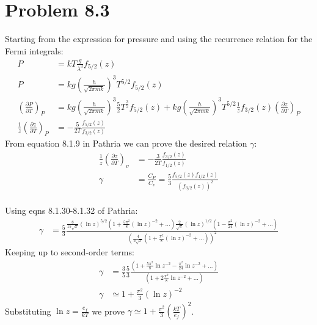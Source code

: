 \documentclass[a4paper,11pt]{article}
\numberwithin{equation}{section}
\begin{document}
\section{Problem 8.3}
Starting from the expression for pressure and using the recurrence relation for the Fermi integrals:
\begin{align}
 P &= kT\frac{g}{\lambda^3}f_{5/2}(z)\\
 P &= kg\left(\frac{h}{\sqrt{2\pi mk}}\right)^3T^{5/2}f_{5/2}(z)\\
 \left(\frac{\partial P}{\partial T}\right)_P &= kg\left(\frac{h}{\sqrt{2\pi mk}}\right)^3\frac{5}{2}T^{\frac{3}{2}}f_{5/2}(z)+
						kg\left(\frac{h}{\sqrt{2\pi mk}}\right)^3T^{5/2}\frac{1}{z}f_{3/2}(z)\left(\frac{\partial z}{\partial T} \right)_P\\
 \frac{1}{z}\left(\frac{\partial z}{\partial T} \right)_P &= -\frac{5}{2T}\frac{f_{5/2}(z)}{f_{3/2}(z)}
\end{align}
From equation 8.1.9 in Pathria we can prove the desired relation $\gamma$:
\begin{align}
  \frac{1}{z}\left(\frac{\partial z}{\partial T} \right)_v &= -\frac{3}{2T}\frac{f_{3/2}(z)}{f_{1/2}(z)}\\
  \gamma &= \frac{C_P}{C_v} = \frac{5}{3}\frac{f_{5/2}(z)f_{1/2}(z)}{(f_{3/2}(z))^2}
\end{align}
\\
Using eqns 8.1.30-8.1.32 of Pathria:
\begin{align}
 \gamma &= \frac{5}{3}\frac{\frac{8}{15\sqrt{\pi}}(\ln{z})^{5/2}(1+\frac{5\pi^2}{8}(\ln{z})^{-2}+...)\frac{2}{\sqrt{\pi}}(\ln{z})^{1/2}(1-\frac{\pi^2}{24}(\ln{z})^{-2}+...)}
	    {\left(\frac{4}{3\sqrt{\pi}}(1+\frac{\pi^2}{8}(\ln{z})^{-2}+...) \right)^2}
\end{align}
Keeping up to second-order terms:
\begin{align}
 \gamma &= \frac{3}{5}\frac{5}{3}\frac{(1+\frac{5\pi^2}{8}\ln{z}^{-2}-\frac{\pi^2}{24}\ln{z}^{-2}+...)}{(1+2\frac{\pi^2}{8}\ln{z}^{-2}+...)}\\
 \gamma &\simeq 1+\frac{\pi^2}{3}(\ln{z})^{-2}
\end{align}
Substituting $\ln{z} = \frac{e_f}{kT}$ we prove $\gamma \simeq 1+\frac{\pi^2}{3}(\frac{kT}{e_f})^{2}$.
\\
\end{document}
